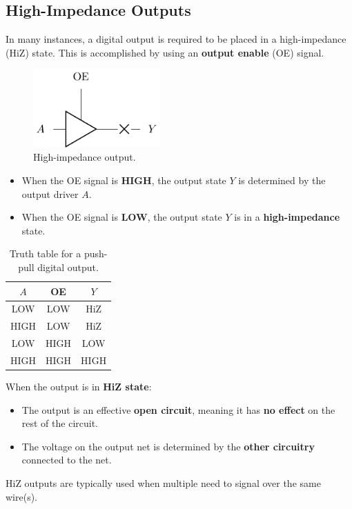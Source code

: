 \documentclass{report}
\begin{document}
\subsection{High-Impedance Outputs}
In many instances, a digital output is required to be placed in a high-impedance (HiZ) state.
This is accomplished by using an \textbf{output enable} (OE) signal.
\begin{figure}[H]
    \centering
    \includegraphics[height = 3cm, keepaspectratio = true]{figures/HiZ.pdf}
    \caption{High-impedance output.} %
\end{figure}
\begin{itemize}
    \item When the OE signal is \textbf{HIGH}, the output state \(Y\) is determined by the output driver \(A\).
    \item When the OE signal is \textbf{LOW}, the output state \(Y\) is in a \textbf{high-impedance} state.
\end{itemize}
\begin{table}[H]
    \centering
    \begin{tabular}{c c | c} %
        \toprule
        \textbf{\(A\)} & \textbf{OE} & \textbf{\(Y\)} \\
        \midrule
        LOW            & LOW         & HiZ            \\
        HIGH           & LOW         & HiZ            \\
        LOW            & HIGH        & LOW            \\
        HIGH           & HIGH        & HIGH           \\
        \bottomrule
    \end{tabular}
    \caption{Truth table for a push-pull digital output.} %
\end{table}
When the output is in \textbf{HiZ state}:
\begin{itemize}
    \item The output is an effective \textbf{open circuit}, meaning it has \textbf{no effect} on the rest of the circuit.
    \item The voltage on the output net is determined by the \textbf{other circuitry} connected to the net.
\end{itemize}
HiZ outputs are typically used when multiple need to signal over the same wire(s).
\end{document}
